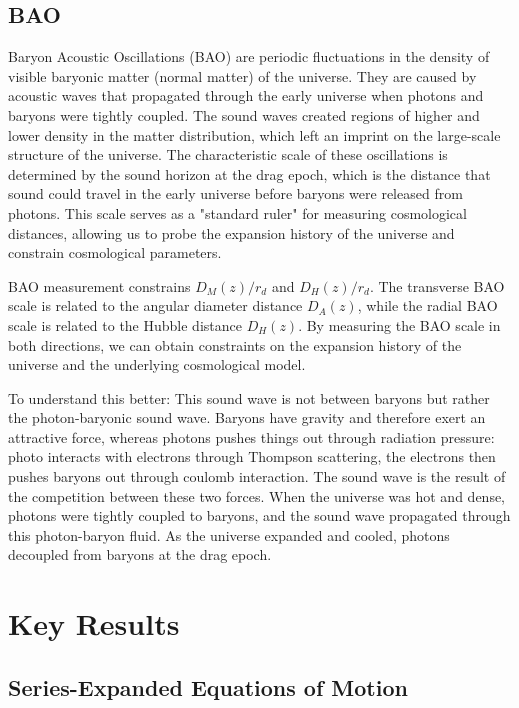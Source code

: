 \documentclass{article}
\begin{document}
\subsection{BAO}
Baryon Acoustic Oscillations (BAO) are periodic fluctuations in the density of visible baryonic matter (normal matter) of the universe. They are caused by acoustic waves that propagated through the early universe when photons and baryons were tightly coupled. The sound waves created regions of higher and lower density in the matter distribution, which left an imprint on the large-scale structure of the universe. The characteristic scale of these oscillations is determined by the sound horizon at the drag epoch, which is the distance that sound could travel in the early universe before baryons were released from photons. This scale serves as a "standard ruler" for measuring cosmological distances, allowing us to probe the expansion history of the universe and constrain cosmological parameters.

BAO measurement constrains $D_M(z)/r_d$ and $D_H(z)/r_d$. The transverse BAO scale is related to the angular diameter distance $D_A(z)$, while the radial BAO scale is related to the Hubble distance $D_H(z)$. By measuring the BAO scale in both directions, we can obtain constraints on the expansion history of the universe and the underlying cosmological model.

To understand this better: This sound wave is not between baryons but rather the photon-baryonic sound wave. Baryons have gravity and therefore exert an attractive force, whereas photons pushes things out through radiation pressure: photo interacts with electrons through Thompson scattering, the electrons then pushes baryons out through coulomb interaction. The sound wave is the result of the competition between these two forces. When the universe was hot and dense, photons were tightly coupled to baryons, and the sound wave propagated through this photon-baryon fluid. As the universe expanded and cooled, photons decoupled from baryons at the drag epoch.



\section{Key Results}

\subsection{Series-Expanded Equations of Motion}
\end{document}
